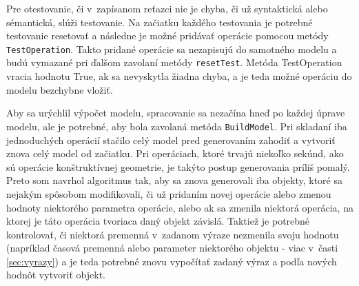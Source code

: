 Pre otestovanie, či v~zapísanom reťazci nie je chyba, či už syntaktická alebo sémantická, slúži testovanie. Na začiatku každého testovania je potrebné testovanie resetovať a následne je možné pridávať operácie pomocou metódy \texttt{TestOperation}. 
Takto pridané operácie sa nezapisujú do samotného modelu a budú vymazané pri ďalšom zavolaní metódy \texttt{resetTest}. Metóda TestOperation vracia hodnotu True, ak sa nevyskytla žiadna chyba, a je teda možné operáciu do modelu bezchybne vložiť.


Aby sa urýchlil výpočet modelu, spracovanie sa nezačína hneď po každej úprave modelu, ale je potrebné, aby bola zavolaná metóda \texttt{BuildModel}.
Pri skladaní iba jednoduchých operácií stačilo celý model pred generovaním zahodiť a vytvoriť znova celý model od začiatku. Pri operáciach, ktoré trvajú niekoľko sekúnd, ako sú operácie konštruktívnej geometrie, je takýto postup generovania príliš pomalý.
Preto som navrhol algoritmus tak, aby sa znova generovali iba objekty, ktoré sa nejakým spôsobom modifikovali, či už pridaním novej operácie alebo zmenou hodnoty niektorého parametra operácie, alebo ak sa zmenila niektorá operácia, na ktorej je táto operácia tvoriaca daný objekt závislá. Taktiež je potrebné kontrolovať, či niektorá premenná v~zadanom výraze nezmenila svoju hodnotu (napríklad časová premenná alebo parameter niektorého objektu - viac v~časti \ref{sec:vyrazy}) a je teda potrebné znovu vypočítať zadaný výraz a podľa nových hodnôt vytvoriť objekt. 








